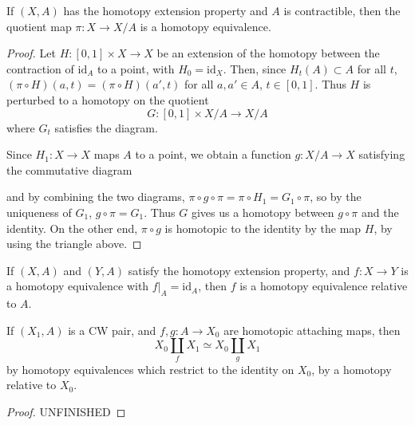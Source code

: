 \begin{theorem}
    If $(X,A)$ has the homotopy extension property and $A$ is contractible, then the quotient map $\pi:X \to X/A$ is a homotopy equivalence.
\end{theorem}
\begin{proof}
    Let $H: [0,1] \times X \to X$ be an extension of the homotopy between the contraction of $\text{id}_A$ to a point, with $H_0 = \text{id}_X$. Then, since $H_t(A) \subset A$ for all $t$, $(\pi \circ H)(a,t) = (\pi \circ H)(a',t)$ for all $a,a' \in A$, $t \in [0,1]$. Thus $H$ is perturbed to a homotopy on the quotient
    \[ G: [0,1] \times X/A \to X/A \]
    where $G_t$ satisfies the diagram.
    \begin{center}
    \end{center}
    Since $H_1: X \to X$ maps $A$ to a point, we obtain a function $g: X/A \to X$ satisfying the commutative diagram
    \begin{center}
    \end{center}
    and by combining the two diagrams, $\pi \circ g \circ \pi = \pi \circ H_1 = G_1 \circ \pi$, so by the uniqueness of $G_1$, $g \circ \pi = G_1$. Thus $G$ gives us a homotopy between $g \circ \pi$ and the identity. On the other end, $\pi \circ g$ is homotopic to the identity by the map $H$, by using the triangle above.
\end{proof}

\begin{theorem}
    If $(X,A)$ and $(Y,A)$ satisfy the homotopy extension property, and $f:X \to Y$ is a homotopy equivalence with $f|_A = \text{id}_A$, then $f$ is a homotopy equivalence relative to $A$.
\end{theorem}

\begin{theorem}
    If $(X_1,A)$ is a CW pair, and $f,g : A \to X_0$ are homotopic attaching maps, then
    \[ X_0 \coprod_f X_1 \simeq X_0 \coprod_g X_1 \]
    by homotopy equivalences which restrict to the identity on $X_0$, by a homotopy relative to $X_0$.
\end{theorem}
\begin{proof}
    UNFINISHED
\end{proof}


